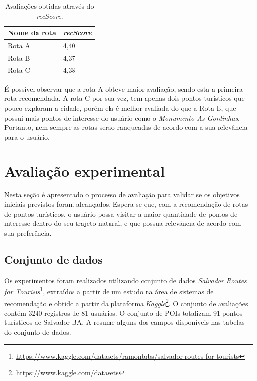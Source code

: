 \documentclass[portuguese]{textolivre}
\begin{document}
\begin{table}[h!]
\centering
\begin{threeparttable}
\caption{Avaliações obtidas através do \textit{recScore}.}
\label{tab:table4}
\begin{tabular}{ll} 
\toprule
Nome da rota & \textit{recScore} \\ 
\midrule
Rota A & 4,40 \\
Rota B & 4,37 \\
Rota C & 4,38 \\ 
\bottomrule
\end{tabular}
\end{threeparttable}
\end{table}

É possível observar que a rota A obteve maior avaliação, sendo esta a primeira rota recomendada. A rota C por sua vez, tem apenas dois pontos turísticos que pouco exploram a cidade, porém ela é melhor avaliada do que a Rota B, que possui mais pontos de interesse do usuário como o \textit{Monumento As Gordinhas}. Portanto, nem sempre as rotas serão ranqueadas de acordo com a sua relevância para o usuário.


\section{Avaliação experimental}\label{sec_6}
Nesta seção é apresentado o processo de avaliação para validar se os objetivos iniciais previstos foram alcançados. Espera-se que, com a recomendação de rotas de pontos turísticos, o usuário possa visitar a maior quantidade de pontos de interesse dentro do seu trajeto natural, e que possua relevância de acordo com sua preferência.


\subsection{Conjunto de dados}\label{conjunto-dados}
Os experimentos foram realizados utilizando conjunto de dados \textit{Salvador Routes for Tourists}\footnote{\url{https://www.kaggle.com/datasets/ramonbrbs/salvador-routes-for-tourists}}, extraídos a partir de um estudo na área de sistemas de recomendação e obtido a partir da plataforma \textit{Kaggle}\footnote{\url{https://www.kaggle.com/datasets}}. O conjunto de avaliações contém 3240 registros de 81 usuários. O conjunto de POIs totalizam 91 pontos turísticos de Salvador-BA. A  resume alguns dos campos disponíveis nas tabelas do conjunto de dados. 
\end{document}
